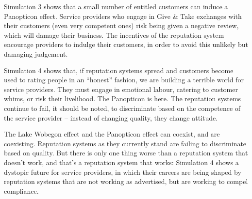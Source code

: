 \documentclass[
  letterpaper,
  DIV=11,
  numbers=noendperiod]{scrartcl}
\begin{document}
Simulation 3 shows that a small number of entitled customers can induce
a Panopticon effect. Service providers who engage in Give \& Take
exchanges with their customers (even very competent ones) risk being
given a negative review, which will damage their business. The
incentives of the reputation system encourage providers to indulge their
customers, in order to avoid this unlikely but damaging judgement.

Simulation 4 shows that, if reputation systems spread and customers
become used to rating people in an ``honest'' fashion, we are building a
terrible world for service providers. They must engage in emotional
labour, catering to customer whims, or risk their livelihood. The
Panopticon is here. The reputation systems continue to fail, it should
be noted, to discriminate based on the competence of the service
provider -- instead of changing quality, they change attitude.

The Lake Wobegon effect and the Panopticon effect can coexist, and are
coexisting. Reputation systems as they currently stand are failing to
discriminate based on quality. But there is only one thing worse than a
reputation system that doesn't work, and that's a reputation system that
works: Simulation 4 shows a dystopic future for service providers, in
which their careers are being shaped by reputation systems that are not
working as advertised, but are working to compel compliance.
\end{document}

